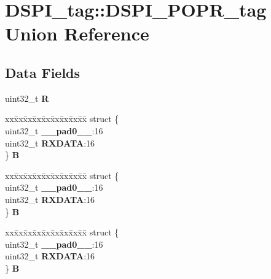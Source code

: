 \hypertarget{unionDSPI__tag_1_1DSPI__POPR__tag}{}\section{D\+S\+P\+I\+\_\+tag\+::D\+S\+P\+I\+\_\+\+P\+O\+P\+R\+\_\+tag Union Reference}
\label{unionDSPI__tag_1_1DSPI__POPR__tag}
\subsection*{Data Fields}
\begin{DoxyCompactItemize}
\item 
\mbox{\label{unionDSPI__tag_1_1DSPI__POPR__tag_ae38c0ca710f82c5c11cca1b8d64c57be}} 
uint32\+\_\+t {\bfseries R}
\item 
\mbox{\label{unionDSPI__tag_1_1DSPI__POPR__tag_a96da74db88e9f9ace6e1d5fd581af23f}} 
\begin{tabbing}
xx\=xx\=xx\=xx\=xx\=xx\=xx\=xx\=xx\=\kill
struct \{\\
\>uint32\_t {\bfseries \_\_pad0\_\_}:16\\
\>uint32\_t {\bfseries RXDATA}:16\\
\} {\bfseries B}\\

\end{tabbing}\item 
\mbox{\label{unionDSPI__tag_1_1DSPI__POPR__tag_a77231e0c7be2c77044a0b23eddd24430}} 
\begin{tabbing}
xx\=xx\=xx\=xx\=xx\=xx\=xx\=xx\=xx\=\kill
struct \{\\
\>uint32\_t {\bfseries \_\_pad0\_\_}:16\\
\>uint32\_t {\bfseries RXDATA}:16\\
\} {\bfseries B}\\

\end{tabbing}\item 
\mbox{\label{unionDSPI__tag_1_1DSPI__POPR__tag_a0675009cbfce629121d50d4a1beae761}} 
\begin{tabbing}
xx\=xx\=xx\=xx\=xx\=xx\=xx\=xx\=xx\=\kill
struct \{\\
\>uint32\_t {\bfseries \_\_pad0\_\_}:16\\
\>uint32\_t {\bfseries RXDATA}:16\\
\} {\bfseries B}\\


\end{tabbing}
\end{DoxyCompactItemize}

